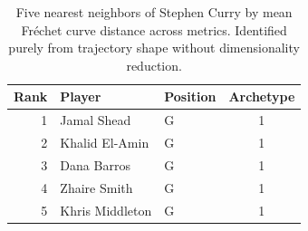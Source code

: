 \begin{table}[htbp]
  \centering\small
  \begin{tabular}{rllc}
    \toprule
    Rank & Player & Position & Archetype \\
    \midrule
    1 & Jamal Shead & G & 1 \\
    2 & Khalid El-Amin & G & 1 \\
    3 & Dana Barros & G & 1 \\
    4 & Zhaire Smith & G & 1 \\
    5 & Khris Middleton & G & 1 \\
    \bottomrule
  \end{tabular}
  \caption{Five nearest neighbors of Stephen Curry by mean Fr\'{e}chet curve distance across metrics. Identified purely from trajectory shape without dimensionality reduction.}
  \label{tab:Stephen_Curry_frechet_curve_neighbors}
\end{table}


